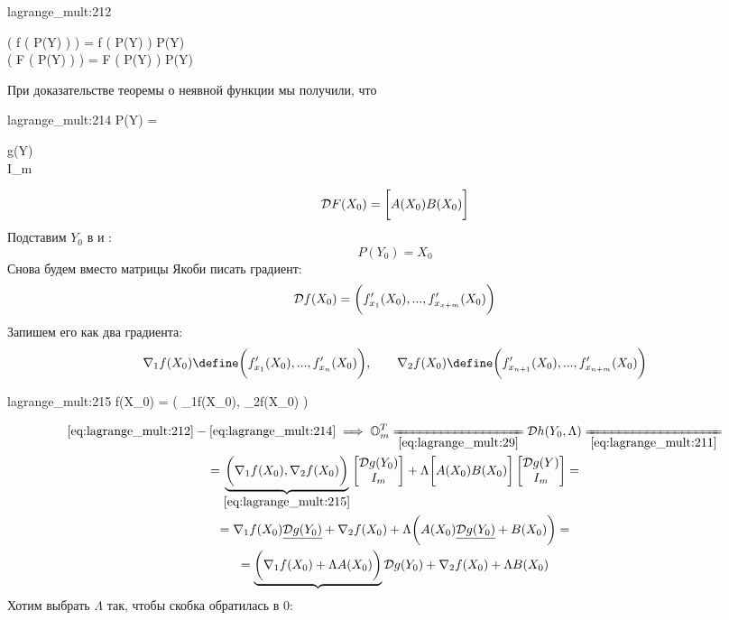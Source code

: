 \begin{iproof}
\begin{equ}{lagrange_mult:212}
		\begin{rcases}
			 \bigg( f \big( P(Y) \big) \bigg) =  f \bigg( P(Y) \bigg) \cdot {}P(Y) \\
			 \bigg( F \big( P(Y) \big) \bigg) =  F \bigg( P(Y) \bigg) \cdot {}P(Y)
		\end{rcases}
	\end{equ}
	При доказательстве теоремы о неявной функции мы получили, что
	\begin{equ}{lagrange_mult:214}
		P(Y) =
		\begin{bmatrix}
			g(Y) \\
			I_m
		\end{bmatrix}
	\end{equ}
	$$ \mathcal{D}F(X_0) = \bigg[ A(X_0)B(X_0) \bigg] $$
	Подставим $ Y_0 $ в  и \eref{lagrange_mult:212}:
	$$ P(Y_0) = X_0 $$
	Снова будем вместо матрицы Якоби писать градиент:
	$$ \mathcal{D}f(X_0) = \bigg( f_{x_1}'(X_0), ..., f_{x_{x + m}}'(X_0) \bigg) $$
	Запишем его как два градиента:
	$$ \nabla_1f(X_0) \define \bigg( f_{x_1}'(X_0), ..., f_{x_n}'(X_0) \bigg), \qquad \nabla_2f(X_0) \define \bigg( f_{x_{n + 1}}'(X_0), ..., f_{x_{n + m}}'(X_0) \bigg) $$
	\begin{equ}{lagrange_mult:215}
		f(X_0) = \bigg( \nabla_1f(X_0), \nabla_2f(X_0) \bigg)
	\end{equ}
	\begin{multline}\lbl{lagrange_mult:216}
		\eref{lagrange_mult:212} - \eref{lagrange_mult:214} \implies \On[m]^T \undereq{\eref{lagrange_mult:29}} \mc{D}h(Y_0, \Lambda) \undereq{\eref{lagrange_mult:211}} \\
		= \underbrace{\bigg( \nabla_1f(X_0), \nabla_2f(X_0) \bigg)}_{\eref{lagrange_mult:215}}
		\begin{bmatrix}
			\mc{D}g(Y_0) \\
			I_m
		\end{bmatrix} + \Lambda \bigg[ A(X_0)B(X_0) \bigg]
		\begin{bmatrix}
			\mc{D}g(Y) \\
			I_m
		\end{bmatrix} = \\
		= \nabla_1f(X_0)\underline{\mc{D}g(Y_0)} + \nabla_2f(X_0) + \Lambda \bigg( A(X_0)\underline{\mc{D}g(Y_0)} + B(X_0) \bigg) = \\
		= \underbrace{\bigg( \nabla_1f(X_0) + \Lambda A(X_0) \bigg)} \mc{D}g(Y_0) + \nabla_2 f(X_0) + \Lambda B(X_0)
	\end{multline}
	Хотим выбрать $ \Lambda $ так, чтобы скобка обратилась в 0:

\end{iproof}
